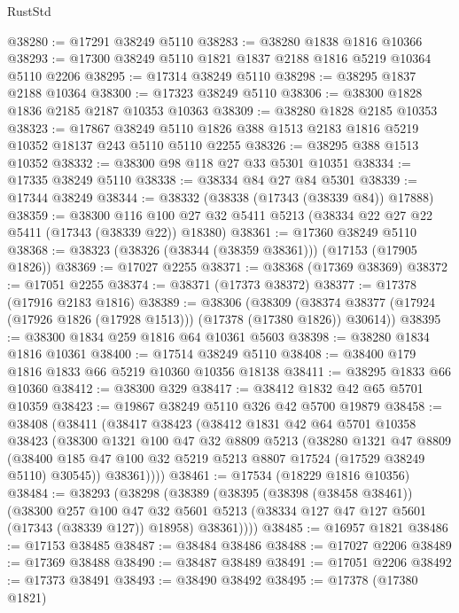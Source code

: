 \begin{lexlean}{RustStd}
\begin{coremodule}
@38280 := @17291 @38249 @5110
@38283 := @38280 @1838 @1816 @10366
@38293 := @17300 @38249 @5110 @1821 @1837 @2188 @1816 @5219 @10364 @5110 @2206
@38295 := @17314 @38249 @5110
@38298 := @38295 @1837 @2188 @10364
@38300 := @17323 @38249 @5110
@38306 := @38300 @1828 @1836 @2185 @2187 @10353 @10363
@38309 := @38280 @1828 @2185 @10353
@38323 := @17867
    @38249
    @5110
    @1826
    @388
    @1513
    @2183
    @1816
    @5219
    @10352
    @18137
    @243
    @5110
    @5110
    @2255
@38326 := @38295 @388 @1513 @10352
@38332 := @38300 @98 @118 @27 @33 @5301 @10351
@38334 := @17335 @38249 @5110
@38338 := @38334 @84 @27 @84 @5301
@38339 := @17344 @38249
@38344 := @38332 (@38338 (@17343 (@38339 @84)) @17888)
@38359 := @38300
    @116
    @100
    @27
    @32
    @5411
    @5213
    (@38334 @22 @27 @22 @5411 (@17343 (@38339 @22)) @18380)
@38361 := @17360 @38249 @5110
@38368 := @38323 (@38326 (@38344 (@38359 @38361))) (@17153 (@17905 @1826))
@38369 := @17027 @2255
@38371 := @38368 (@17369 @38369)
@38372 := @17051 @2255
@38374 := @38371 (@17373 @38372)
@38377 := @17378 (@17916 @2183 @1816)
@38389 := @38306
    (@38309 (@38374 @38377 (@17924 (@17926 @1826 (@17928 @1513))) (@17378 (@17380 @1826)) @30614))
@38395 := @38300 @1834 @259 @1816 @64 @10361 @5603
@38398 := @38280 @1834 @1816 @10361
@38400 := @17514 @38249 @5110
@38408 := @38400 @179 @1816 @1833 @66 @5219 @10360 @10356 @18138
@38411 := @38295 @1833 @66 @10360
@38412 := @38300 @329
@38417 := @38412 @1832 @42 @65 @5701 @10359
@38423 := @19867 @38249 @5110 @326 @42 @5700 @19879
@38458 := @38408
    (@38411
      (@38417
        @38423
        (@38412
          @1831
          @42
          @64
          @5701
          @10358
          @38423
          (@38300
            @1321
            @100
            @47
            @32
            @8809
            @5213
            (@38280
              @1321
              @47
              @8809
              (@38400 @185 @47 @100 @32 @5219 @5213 @8807 @17524 (@17529 @38249 @5110) @30545))
            @38361))))
@38461 := @17534 (@18229 @1816 @10356)
@38484 := @38293
    (@38298
      (@38389
        (@38395
          (@38398 (@38458 @38461))
          (@38300
            @257
            @100
            @47
            @32
            @5601
            @5213
            (@38334 @127 @47 @127 @5601 (@17343 (@38339 @127)) @18958)
            @38361))))
@38485 := @16957 @1821
@38486 := @17153 @38485
@38487 := @38484 @38486
@38488 := @17027 @2206
@38489 := @17369 @38488
@38490 := @38487 @38489
@38491 := @17051 @2206
@38492 := @17373 @38491
@38493 := @38490 @38492
@38495 := @17378 (@17380 @1821)

\end{coremodule}
\end{lexlean}
